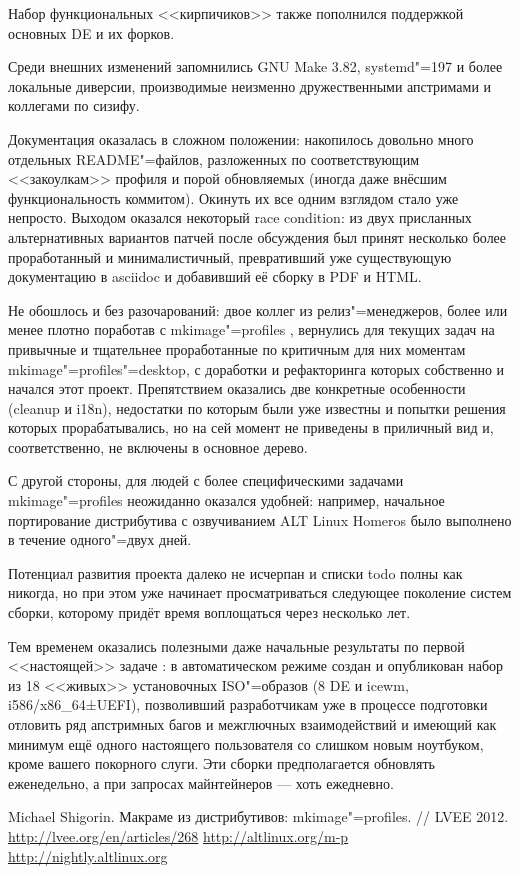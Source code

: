 \documentclass[10pt, a5paper]{article}
\begin{document}
Набор функциональных <<кирпичиков>> также пополнился поддержкой основных DE и их форков.

Среди внешних изменений запомнились GNU Make 3.82, systemd"=197 и более локальные диверсии, производимые неизменно дружественными апстримами и коллегами по сизифу.

Документация оказалась в сложном положении: накопилось довольно много отдельных README"=файлов, разложенных по соответствующим <<закоулкам>> профиля и порой обновляемых (иногда даже внёсшим функциональность коммитом). Окинуть их все одним взглядом стало уже непросто. Выходом оказался некоторый race condition: из двух присланных альтернативных вариантов патчей после обсуждения был принят несколько более проработанный и минималистичный, превративший уже существующую документацию в asciidoc и добавивший её сборку в PDF и HTML.

Не обошлось и без разочарований: двое коллег из релиз"=менеджеров, более или менее плотно поработав с mkimage"=profiles \cite{Shigorinw2}, вернулись для текущих задач на привычные и тщательнее проработанные по критичным для них моментам mkimage"=profiles"=desktop, с доработки и рефакторинга которых собственно и начался этот проект.  Препятствием оказались две конкретные особенности (cleanup и i18n), недостатки по которым были уже известны и попытки решения которых прорабатывались, но на сей момент не приведены в приличный вид и, соответственно, не включены в основное дерево.

С другой стороны, для людей с более специфическими задачами mkimage"=profiles неожиданно оказался удобней: например, начальное портирование дистрибутива с озвучиванием ALT Linux Homeros было выполнено в течение одного"=двух дней.

Потенциал развития проекта далеко не исчерпан и списки todo полны как никогда, но при этом уже начинает просматриваться следующее поколение систем сборки, которому придёт время воплощаться через несколько лет.

Тем временем оказались полезными даже начальные результаты по первой <<настоящей>> задаче \cite{Shigorinw3}: в автоматическом режиме создан и опубликован набор из 18 <<живых>> установочных ISO"=образов (8 DE и icewm, i586/x86\_64±UEFI), позволивший разработчикам уже в процессе подготовки отловить ряд апстримных багов и межглючных взаимодействий и имеющий как минимум ещё одного настоящего пользователя со слишком новым ноутбуком, кроме вашего покорного слуги.  Эти сборки предполагается обновлять еженедельно, а при запросах майнтейнеров --- хоть ежедневно.


\begin{thebibliography}{99}
 Michael Shigorin. Макраме из дистрибутивов: mkimage"=profiles. // LVEE 2012. \url{http://lvee.org/en/articles/268}
 \url{http://altlinux.org/m-p}
 \url{http://nightly.altlinux.org}
\end{thebibliography}
\end{document}
